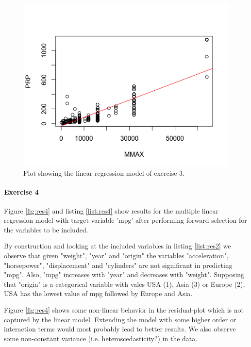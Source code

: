 \documentclass{paper}
\begin{document}
\begin{figure}
  \begin{center}
    \quad\quad
    \includegraphics[width=.8\linewidth]{ex3}
  \end{center}
  \caption{Plot showing the linear regression
   model of exercise 3.}
   \label{fig:ex3}
\end{figure}

\paragraph{Exercise 4}

Figure \ref{fig:res4} and listing \ref{list:res4} show results for the multiple
linear regression model with target variable 'mpg' after performing forward selection
for the variables to be included.

By construction and looking at the included variables in listing \ref{list:res2} we
observe that given "weight", "year" and "origin" the variables "acceleration",
 "horsepower", "displacement" and "cylinders" are not significant in predicting
"mpg". Also, "mpg" increases with "year" and decreases with "weight". Supposing
that "origin" is a categorical variable with vales USA (1), Asia (3) or Europe (2),
USA has the lowest value of mpg followed by Europe and Asia.

Figure \ref{fig:res4} shows some non-linear behavior in the residual-plot
which is not captured by the linear model. Extending the model with some
higher order or interaction terms would most probably lead to better results.
We also observe some non-constant variance (i.e. heteroscedasticity?) in the data.
\end{document}
